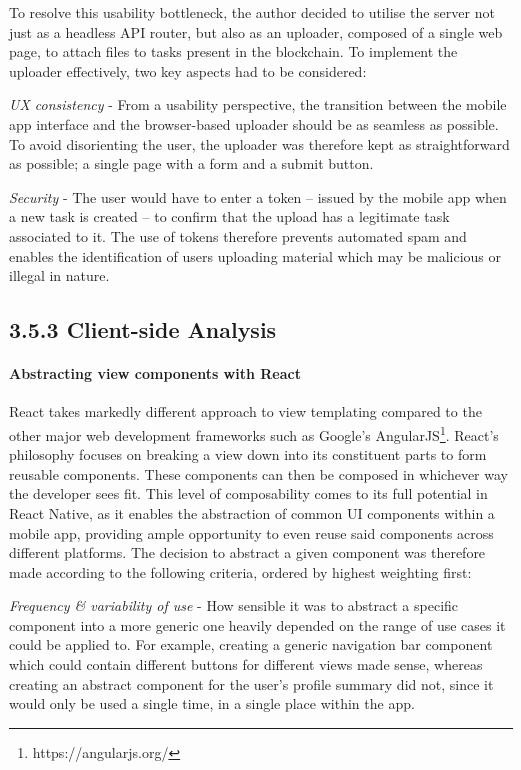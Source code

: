 To resolve this usability bottleneck, the author decided to utilise the
server not just as a headless API router, but also as an uploader,
composed of a single web page, to attach files to tasks present in the
blockchain. To implement the uploader effectively, two key aspects had
to be considered:

\emph{UX consistency} - From a usability perspective, the transition
between the mobile app interface and the browser-based uploader should
be as seamless as possible. To avoid disorienting the user, the uploader
was therefore kept as straightforward as possible; a single page with a
form and a submit button.

\emph{Security} - The user would have to enter a token -- issued by the
mobile app when a new task is created -- to confirm that the upload has
a legitimate task associated to it. The use of tokens therefore prevents
automated spam and enables the identification of users uploading
material which may be malicious or illegal in nature.

\subsection{3.5.3 Client-side Analysis}\label{client-side-analysis}

\paragraph{Abstracting view components with
React}\label{abstracting-view-components-with-react}

React takes markedly different approach to view templating compared to
the other major web development frameworks such as Google's
AngularJS\footnote{https://angularjs.org/}. React's philosophy
focuses on breaking a view down into its constituent parts to form
reusable components. These components can then be composed in whichever
way the developer sees fit. This level of composability comes to its
full potential in React Native, as it enables the abstraction of common
UI components within a mobile app, providing ample opportunity to even
reuse said components across different platforms. The decision to
abstract a given component was therefore made according to the following
criteria, ordered by highest weighting first:

\emph{Frequency \& variability of use} - How sensible it was to abstract
a specific component into a more generic one heavily depended on the
range of use cases it could be applied to. For example, creating a
generic navigation bar component which could contain different buttons
for different views made sense, whereas creating an abstract component
for the user's profile summary did not, since it would only be used a
single time, in a single place within the app.

